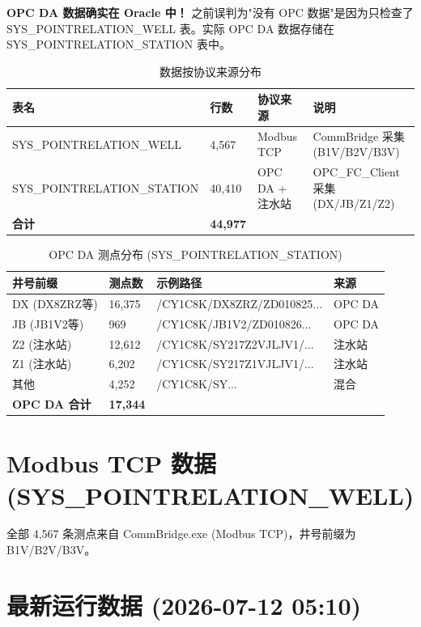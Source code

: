\documentclass[12pt,a4paper]{ctexart}
\begin{document}
\textbf{OPC DA 数据确实在 Oracle 中！} 之前误判为"没有 OPC 数据"是因为只检查了 SYS\_POINTRELATION\_WELL 表。实际 OPC DA 数据存储在 SYS\_POINTRELATION\_STATION 表中。

\begin{table}[H]\centering
\caption{数据按协议来源分布}
\begin{tabular}{p{4cm}p{3cm}p{3cm}p{4cm}}
\toprule
\textbf{表名} & \textbf{行数} & \textbf{协议来源} & \textbf{说明} \\
\midrule
SYS\_POINTRELATION\_WELL & 4,567 & Modbus TCP & CommBridge 采集 (B1V/B2V/B3V) \\
SYS\_POINTRELATION\_STATION & 40,410 & OPC DA + 注水站 & OPC\_FC\_Client 采集 (DX/JB/Z1/Z2) \\
\midrule
\textbf{合计} & \textbf{44,977} & & \\
\bottomrule
\end{tabular}
\end{table}

\begin{table}[H]\centering
\caption{OPC DA 测点分布 (SYS\_POINTRELATION\_STATION)}
\begin{tabular}{p{4cm}p{3cm}p{4cm}p{3cm}}
\toprule
\textbf{井号前缀} & \textbf{测点数} & \textbf{示例路径} & \textbf{来源} \\
\midrule
DX (DX8ZRZ等) & 16,375 & /CY1C8K/DX8ZRZ/ZD010825... & OPC DA \\
JB (JB1V2等) & 969 & /CY1C8K/JB1V2/ZD010826... & OPC DA \\
Z2 (注水站) & 12,612 & /CY1C8K/SY217Z2VJLJV1/... & 注水站 \\
Z1 (注水站) & 6,202 & /CY1C8K/SY217Z1VJLJV1/... & 注水站 \\
其他 & 4,252 & /CY1C8K/SY... & 混合 \\
\midrule
\textbf{OPC DA 合计} & \textbf{17,344} & & \\
\bottomrule
\end{tabular}
\end{table}

\section{Modbus TCP 数据 (SYS\_POINTRELATION\_WELL)}

全部 4,567 条测点来自 CommBridge.exe (Modbus TCP)，井号前缀为 B1V/B2V/B3V。

\section{最新运行数据 (2026-07-12 05:10)}
\end{document}
